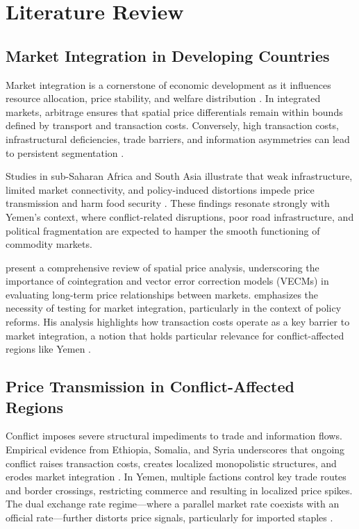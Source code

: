 \section{Literature Review}
\small  %
\setlength{\parskip}{0.3em}  %

\subsection{Market Integration in Developing Countries}
Market integration is a cornerstone of economic development as it influences resource allocation, price stability, and welfare distribution \citep{fackler2001spatial, ravallion1986testing}. In integrated markets, arbitrage ensures that spatial price differentials remain within bounds defined by transport and transaction costs. Conversely, high transaction costs, infrastructural deficiencies, trade barriers, and information asymmetries can lead to persistent segmentation \citep{dercon1995market, baulch1997transfer}.

Studies in sub-Saharan Africa and South Asia illustrate that weak infrastructure, limited market connectivity, and policy-induced distortions impede price transmission and harm food security \citep{mcnew1996spatial, rashid2008spatial}. These findings resonate strongly with Yemen's context, where conflict-related disruptions, poor road infrastructure, and political fragmentation are expected to hamper the smooth functioning of commodity markets.

\citet{fackler2001spatial} present a comprehensive review of spatial price analysis, underscoring the importance of cointegration and vector error correction models (VECMs) in evaluating long-term price relationships between markets. \citet{ravallion1986testing} emphasizes the necessity of testing for market integration, particularly in the context of policy reforms. His analysis highlights how transaction costs operate as a key barrier to market integration, a notion that holds particular relevance for conflict-affected regions like Yemen \citep{mansour2021market}.

\subsection{Price Transmission in Conflict-Affected Regions}
Conflict imposes severe structural impediments to trade and information flows. Empirical evidence from Ethiopia, Somalia, and Syria underscores that ongoing conflict raises transaction costs, creates localized monopolistic structures, and erodes market integration \citep{dercon1995market, little2007unofficial, mansour2021market}. In Yemen, multiple factions control key trade routes and border crossings, restricting commerce and resulting in localized price spikes. The dual exchange rate regime—where a parallel market rate coexists with an official rate—further distorts price signals, particularly for imported staples \citep{worldbank2022yemen}.

